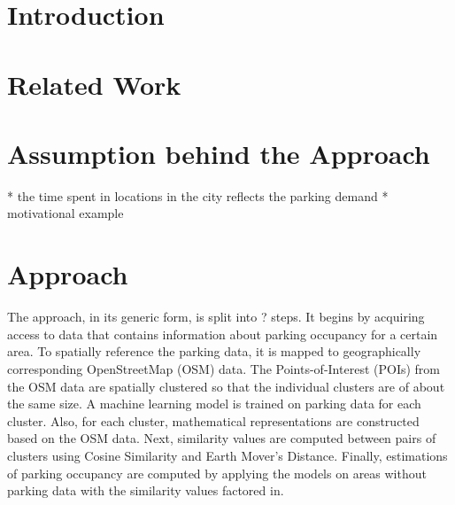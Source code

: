 \documentclass{article}
\begin{document}
	\section{Introduction}
	
	\section{Related Work}
	
	\section{Assumption behind the Approach}
	* the time spent in locations in the city reflects the parking demand
	* motivational example
	
	\section{Approach}
		The approach, in its generic form, is split into ? steps. It begins by acquiring access to data that contains information about parking occupancy for a certain area. To spatially reference the parking data, it is mapped to geographically corresponding OpenStreetMap (OSM) data. The Points-of-Interest (POIs) from the OSM data are spatially clustered so that the individual clusters are of about the same size. A machine learning model is trained on parking data for each cluster. Also, for each cluster, mathematical representations are constructed based on the OSM data. Next, similarity values are computed between pairs of clusters using Cosine Similarity and Earth Mover's Distance. Finally, estimations of parking occupancy are computed by applying the models on areas without parking data with the similarity values factored in.   
		
\end{document}
